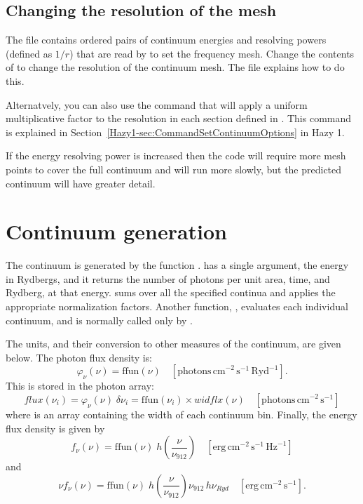 \subsection{Changing the resolution of the mesh}
\label{sec:ChangingMeshResolution}

The file  contains ordered pairs of continuum
energies and resolving powers (defined as $1/r$) that are read by
 to set the frequency mesh. Change the
contents of  to change the resolution of the
continuum mesh. The file explains how to do this.

Alternatvely, you can also use the command  that will apply a uniform multiplicative factor to the
resolution in each section defined in . This
command is explained in Section~\ref{Hazy1-sec:CommandSetContinuumOptions} in
Hazy 1.

If the energy resolving power is increased then the code will require more
mesh points to cover the full continuum and will run more slowly, but the
predicted continuum will have greater detail.

\section{Continuum generation}

The continuum is generated by the function .
 has a single argument,
the energy in Rydbergs, and it returns the number of photons per
unit area, time, and Rydberg, at that energy.
 sums over all the
specified continua and applies the appropriate normalization factors.
Another function, ,
evaluates each individual continuum, and is normally
called only by .

The units, and their conversion to other measures of the continuum, are
given below.  The photon flux density is:
\begin{equation}
{\varphi _\nu }(\nu ) = \mathrm{ffun}(\nu )\quad [\mathrm{photons\,
cm}^{-2} \, \mathrm{s}^{-1} \, \mathrm{Ryd}^{-1}] .
\end{equation}
This is stored in the photon array:
\begin{equation}
flux({\nu _i}) = {\varphi _\nu }(\nu )\;\delta {\nu _i} = \mathrm{ffun}({\nu _i})
\times widflx(\nu )\quad [\mathrm{photons\, cm}^{-2}\, \mathrm{s}^{-1}]
\end{equation}
where  is an array containing the width of
each continuum bin.
Finally, the energy flux density is given by
\begin{equation}
{f_\nu }(\nu ) = {\mathrm{ffun}}(\nu )\;h\left( {\frac{\nu }{{{\nu _{912}}}}}
\right)\quad
 [\mathrm{erg\, cm}^{-2}\, \mathrm{s}^{-1}\, \mathrm{Hz}^{-1}]
\end{equation}
and
\begin{equation}
\nu {f_\nu }(\nu ) = {\mathrm{ffun}}(\nu )\;h\left( {\frac{\nu }{{{\nu
_{912}}}}} \right){\nu _{912}}\,h{\nu _{Ryd}}\quad
[\mathrm{erg\, cm}^{-2}\, \mathrm{s}^{-1}].
\end{equation}


